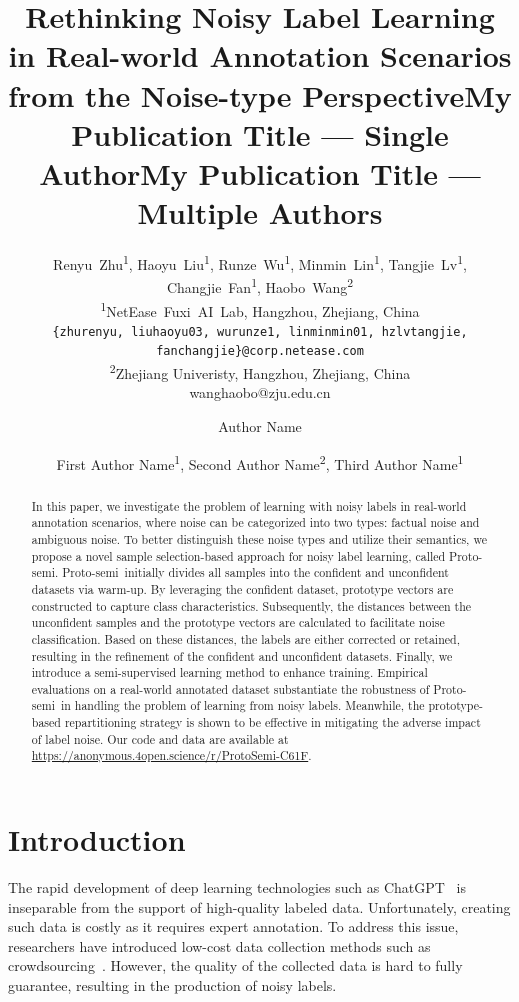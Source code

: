 \documentclass[letterpaper]{article} %
\title{Rethinking Noisy Label Learning in Real-world Annotation Scenarios from the Noise-type Perspective}
\author{
  Renyu~Zhu\textsuperscript{1}, Haoyu~Liu\textsuperscript{1}, Runze~Wu\textsuperscript{1}, Minmin~Lin\textsuperscript{1},
  Tangjie~Lv\textsuperscript{1}, Changjie~Fan\textsuperscript{1}, Haobo~Wang\textsuperscript{2}\\
  \textsuperscript{1}NetEase~Fuxi~AI~Lab,
  Hangzhou, Zhejiang, China \\
  \texttt{\{zhurenyu, liuhaoyu03, wurunze1, linminmin01, hzlvtangjie, fanchangjie\}@corp.netease.com}\\
  \textsuperscript{2}Zhejiang Univeristy, Hangzhou, Zhejiang, China \\
  wanghaobo@zju.edu.cn \\
}
\title{My Publication Title --- Single Author}
\author {
    Author Name
}
\title{My Publication Title --- Multiple Authors}
\author {
    First Author Name\textsuperscript{\rm 1},
    Second Author Name\textsuperscript{\rm 2},
    Third Author Name\textsuperscript{\rm 1}
}
\newcommand{\method}{Proto-semi}
\begin{document}
\maketitle
\begin{abstract}
In this paper, we investigate the problem of learning with noisy labels in real-world annotation scenarios, where noise can be categorized into two types: factual noise and ambiguous noise. To better distinguish these noise types and utilize their semantics, we propose a novel sample selection-based approach for noisy label learning, called \method. \method\ initially divides all samples into the confident and unconfident datasets via warm-up. By leveraging the confident dataset, prototype vectors are constructed to capture class characteristics. Subsequently, the distances between the unconfident samples and the prototype vectors are calculated to facilitate noise classification. Based on these distances, the labels are either corrected or retained, resulting in the refinement of the confident and unconfident datasets. Finally, we introduce a semi-supervised learning method to enhance training. Empirical evaluations on a real-world annotated dataset substantiate the robustness of \method\ in handling the problem of learning from noisy labels. Meanwhile, the prototype-based repartitioning strategy is shown to be effective in mitigating the adverse impact of label noise. Our code and data are available at \url{https://anonymous.4open.science/r/ProtoSemi-C61F}.

\end{abstract}


\section{Introduction}

The rapid development of deep learning technologies such as ChatGPT~\cite{DBLP:conf/nips/Ouyang0JAWMZASR22} is inseparable from the support of high-quality labeled data. 
Unfortunately, 
creating such data is costly as it requires expert annotation.
To address this issue, 
researchers have introduced low-cost data collection methods such as crowdsourcing~\cite{DBLP:journals/cacm/DoanRH11}. 
However, 
the quality of the collected data is hard to fully guarantee, 
resulting in the production of noisy labels.
\end{document}
